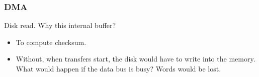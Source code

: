 \begin{frame}
  \frametitle{DMA}
  \begin{block}{Disk read. Why this internal buffer?}
    \begin{itemize}
      \item To compute checksum.
      \item Without, when transfers start, the disk would have to write into the memory. What would happen if the data bus is busy? Words would be lost.
    \end{itemize}
  \end{block}
\end{frame}
